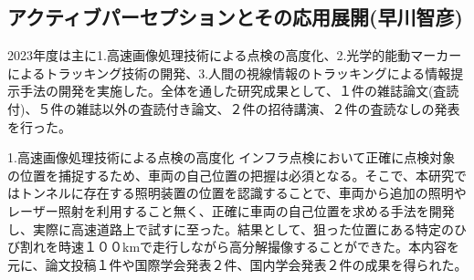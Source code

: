 



\subsection{アクティブパーセプションとその応用展開(早川智彦)}

2023年度は主に1.高速画像処理技術による点検の高度化、2.光学的能動マーカーによるトラッキング技術の開発、3.人間の視線情報のトラッキングによる情報提示手法の開発を実施した。全体を通した研究成果として、１件の雑誌論文(査読付)、５件の雑誌以外の査読付き論文、２件の招待講演、２件の査読なしの発表を行った。

 1.高速画像処理技術による点検の高度化
インフラ点検において正確に点検対象の位置を捕捉するため、車両の自己位置の把握は必須となる。そこで、本研究ではトンネルに存在する照明装置の位置を認識することで、車両から追加の照明やレーザー照射を利用すること無く、正確に車両の自己位置を求める手法を開発し、実際に高速道路上で試すに至った。結果として、狙った位置にある特定のひび割れを時速１００kmで走行しながら高分解撮像することができた。本内容を元に、論文投稿１件や国際学会発表２件、国内学会発表２件の成果を得られた。

